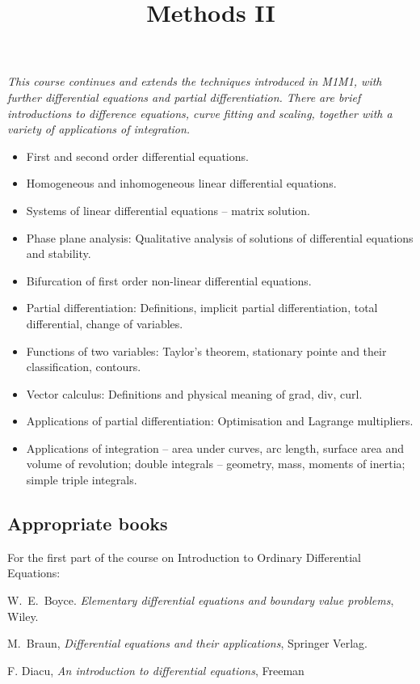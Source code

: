 \documentclass[twoside]{scrartcl}
\title{Methods II}
\begin{document}
{
{\Large\bfseries{}}

\textit{This course continues and extends the techniques introduced in M1M1, with further differential equations and partial differentiation. There are brief introductions to difference equations, curve fitting and scaling, together with a variety of applications of integration.}

\begin{itemize}
\item First and second order differential equations.
\item Homogeneous and inhomogeneous linear differential equations.
\item Systems of linear differential equations – matrix solution.
\item Phase plane analysis: Qualitative analysis of solutions of differential equations and stability.
\item Bifurcation of first order non-linear differential equations.
\item Partial differentiation: Definitions, implicit partial differentiation, total differential, change of variables.
\item Functions of two variables: Taylor’s theorem, stationary pointe and their classification, contours.
\item Vector calculus: Definitions and physical meaning of grad, div, curl.
\item Applications of partial differentiation: Optimisation and Lagrange multipliers.
\item Applications of integration – area under curves, arc length, surface area and volume of revolution; double integrals – geometry, mass, moments of inertia; simple triple integrals.
\end{itemize}

\subsection*{Appropriate books}

For the first part of the course on Introduction to Ordinary Differential Equations:

{\shortskip 
W.~E.~Boyce. \emph{Elementary differential equations and boundary value problems}, Wiley.

M.~Braun, \emph{Differential equations and their applications}, Springer Verlag.

F. Diacu, \emph{An introduction to differential equations}, Freeman

}}
\end{document}
